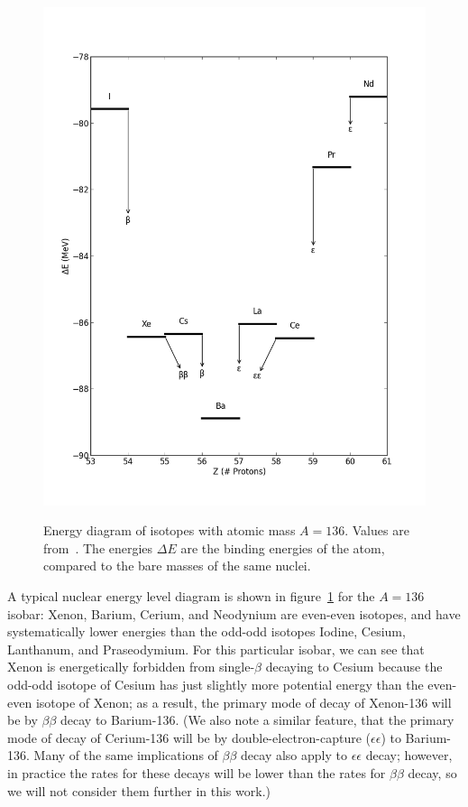 \begin{figure}
\begin{center}
\includegraphics[keepaspectratio=true,width=\textwidth]{scripts/LevelDiagram.png}
\end{center}
\renewcommand{\baselinestretch}{1}
\small\normalsize
\begin{quote}
\caption{Energy diagram of isotopes with atomic mass $A=136$.  Values are from~\cite{AtomicMassEvaluation}.  The energies $\Delta E$ are the binding energies of the atom, compared to the bare masses of the same nuclei.}
\label{fig:LevelDiagram}
\end{quote}
\end{figure}
\renewcommand{\baselinestretch}{2}
\small\normalsize

A typical nuclear energy level diagram is shown in figure~\ref{fig:LevelDiagram} for the $A=136$ isobar: Xenon, Barium, Cerium, and Neodynium are even-even isotopes, and have systematically lower energies than the odd-odd isotopes Iodine, Cesium, Lanthanum, and Praseodymium.  For this particular isobar, we can see that Xenon is energetically forbidden from single-$\beta$ decaying to Cesium because the odd-odd isotope of Cesium has just slightly more potential energy than the even-even isotope of Xenon; as a result, the primary mode of decay of Xenon-136 will be by $\beta\beta$ decay to Barium-136.  (We also note a similar feature, that the primary mode of decay of Cerium-136 will be by double-electron-capture ($\epsilon\epsilon$) to Barium-136.  Many of the same implications of $\beta\beta$ decay also apply to $\epsilon\epsilon$ decay; however, in practice the rates for these decays will be lower than the rates for $\beta\beta$ decay, so we will not consider them further in this work.)

